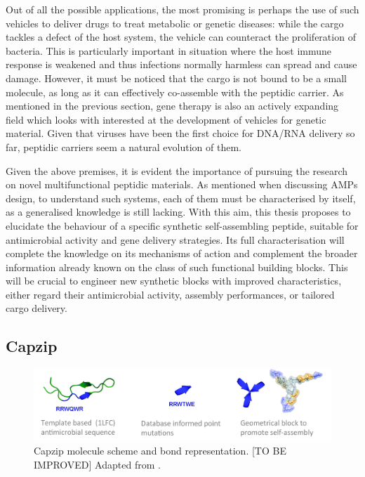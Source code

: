 Out of all the possible applications, the most promising is perhaps the use of such vehicles to deliver drugs to treat metabolic or genetic diseases: while the cargo tackles a defect of the host system, the vehicle can counteract the proliferation of bacteria. This is particularly important in situation where the host immune response is weakened and thus infections normally harmless can spread and cause damage.
%
However, it must be noticed that the cargo is not bound to be a small molecule, as long as it can effectively co-assemble with the peptidic carrier. As mentioned in the previous section, gene therapy is also an actively expanding field which looks with interested at the development of vehicles for genetic material. Given that viruses have been the first choice for DNA/RNA delivery so far, peptidic carriers seem a natural evolution of them.

\bigskip
Given the above premises, it is evident the importance of pursuing the research on novel multifunctional peptidic materials.
As mentioned when discussing AMPs design, to understand such systems, each of them must be characterised by itself, as a generalised knowledge is still lacking.
With this aim, this thesis proposes to elucidate the behaviour of a specific synthetic self-assembling peptide, suitable for antimicrobial activity and gene delivery strategies. Its full characterisation will complete the knowledge on its mechanisms of action and complement the broader information already known on the class of such functional building blocks. This will be crucial to engineer new synthetic blocks with improved characteristics, either regard their antimicrobial activity, assembly performances, or tailored cargo delivery.


\subsection{Capzip} \label{sec:capzip}

\begin{figure}
\begin{center}
\includegraphics[width = \textwidth]{1introduction/pics/capzip.png}
\caption[Cazip molecule]{Capzip molecule scheme and bond representation. [TO BE IMPROVED] Adapted from \citep{Castelletto2016}.} \label{fig:capzip}
\end{center}
\end{figure}

